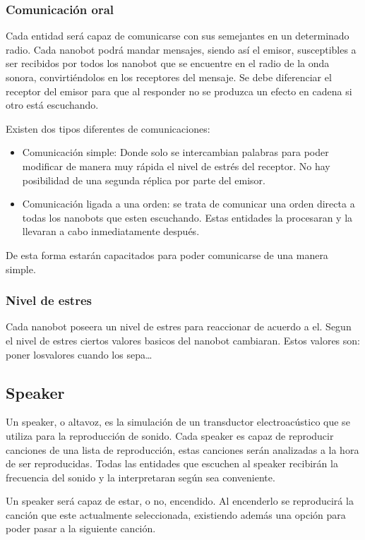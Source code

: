\subsubsection{Comunicación oral}
\label{sec:comunicacion_oral}

Cada entidad será capaz de comunicarse con sus semejantes en un determinado radio.  Cada nanobot podrá mandar mensajes, siendo así el emisor, susceptibles a ser recibidos por todos los nanobot que se encuentre en el radio de la onda sonora, convirtiéndolos en los receptores del mensaje. Se debe diferenciar el receptor del emisor para que al responder no se produzca un efecto en cadena si otro está escuchando.

Existen dos tipos diferentes de comunicaciones:
\begin{itemize}
 \item Comunicación simple: Donde solo se intercambian palabras para poder modificar de manera muy rápida el nivel de estrés del receptor. No hay posibilidad de una segunda réplica por parte del emisor. 
 \item Comunicación ligada a una orden: se trata de comunicar una orden directa a todas los nanobots que esten escuchando. Estas entidades la procesaran y la llevaran a cabo inmediatamente después.  
\end{itemize}

De esta forma estarán capacitados para poder comunicarse de una manera simple. 

\subsubsection{Nivel de estres}
\label{sec:nivel_estres}
Cada nanobot poseera un nivel de estres para reaccionar de acuerdo a el. Segun el nivel de estres ciertos valores basicos del nanobot cambiaran. Estos valores son:
poner losvalores cuando los sepa…

\subsection{Speaker}
Un speaker, o altavoz, es la simulación de un transductor electroacústico que se utiliza para la reproducción de sonido. Cada speaker es capaz de reproducir canciones de una lista de reproducción, estas canciones serán analizadas a la hora de ser reproducidas. Todas las entidades que escuchen al speaker recibirán la frecuencia del sonido y la interpretaran según sea conveniente.
 
Un speaker será capaz de estar, o no, encendido. Al encenderlo se reproducirá la canción que este actualmente seleccionada, existiendo además una opción para poder pasar a la siguiente canción.
 
